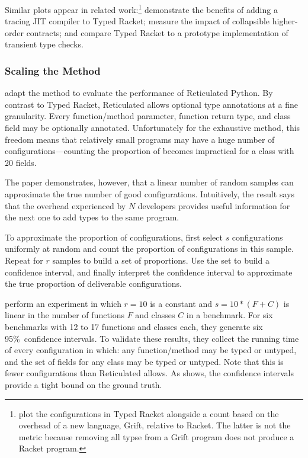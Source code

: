 Similar plots appear in related work:\footnote{\citet{kat-pldi-2019} plot the
  configurations in Typed Racket alongside a count based on
 the overhead of a new language, Grift, relative to Racket.
 The latter is not the  metric because removing all typse from
 a Grift program does not produce a Racket program.}
\citet{bbst-oopsla-2017} demonstrate the benefits of adding a tracing JIT compiler to Typed Racket;
\citet{fgsfs-oopsla-2018} measure the impact of collapsible higher-order contracts; and
\citet{gf-icfp-2018} compare Typed Racket to a prototype implementation of transient type checks.


\subsubsection{Scaling the Method}

\citet{gm-pepm-2018} adapt the method to evaluate the performance of Reticulated
 Python.
By contrast to Typed Racket, Reticulated allows optional type annotations at
 a fine granularity.
Every function/method parameter, function return type, and class field may
 be optionally annotated.
Unfortunately for the exhaustive method, this freedom means that relatively
 small programs may have a huge number of configurations---counting
 the proportion of  becomes impractical for a class with 20 fields.

The paper demonstrates, however, that a linear number of random samples can
 approximate the true number of good configurations.
Intuitively, the result says that the overhead experienced by $N$ developers
 provides useful information for the next one to add types to the same program.

To approximate the proportion of  configurations,
 first select $s$ configurations uniformly at random and count the
 proportion of  configurations in this sample.
Repeat for $r$ samples to build a set of proportions.
Use the set to build a confidence interval, and finally interpret the
 confidence interval to approximate the true proportion of deliverable configurations.

\citet{gm-pepm-2018} perform an experiment in which $r=10$ is a constant
 and $s = 10 * (F + C)$ is linear in the number of functions $F$ and classes
 $C$ in a benchmark.
For six benchmarks with 12 to 17 functions and classes each,
 they generate six 95\%~confidence intervals.
To validate these results, they collect the running time of every configuration
 in which: any function/method may be typed or untyped, and the set of fields
 for any class may be typed or untyped.
Note that this is fewer configurations than Reticulated allows.
As  shows, the confidence intervals provide a tight
 bound on the ground truth.

